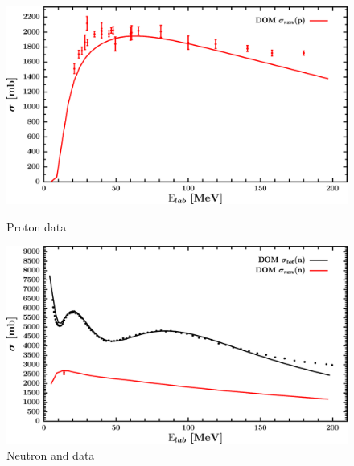 \begin{figure}[H]
    \centering
    \begin{minipage}{0.45\textwidth}
        \centering
        \includegraphics[width=1.0\textwidth]{figures/pb208_protonInelastic.png}
        \caption{Proton \rxn data}
        \label{DOMFitData_pb208_proton_inelastic}
    \end{minipage}\hfill
    \begin{minipage}{0.45\textwidth}
        \centering
        \includegraphics[width=1.0\textwidth]{figures/pb208_neutronInelastic.png}
        \caption{Neutron \rxn and \tot data}
        \label{DOMFitData_pb208_neutron_inelastic}
    \end{minipage}
\end{figure}

\afterpage{\clearpage}

